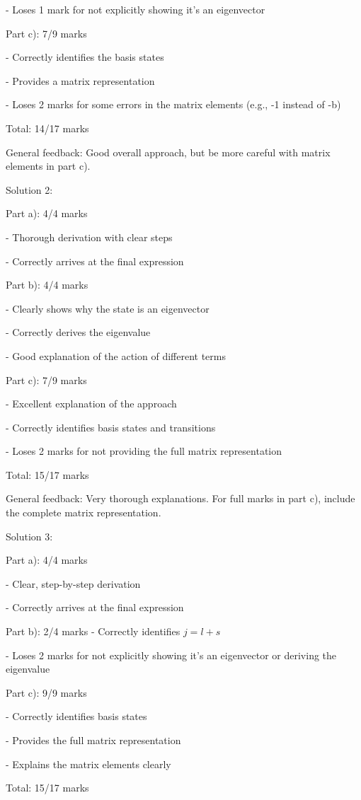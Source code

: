 \documentclass[a4paper,11pt]{article}
\begin{document}
- Loses 1 mark for not explicitly showing it's an eigenvector

Part c): 7/9 marks

- Correctly identifies the basis states

- Provides a matrix representation

- Loses 2 marks for some errors in the matrix elements (e.g., -1 instead of -b)

Total: 14/17 marks

General feedback: Good overall approach, but be more careful with matrix elements in part c).

Solution 2:

Part a): 4/4 marks

- Thorough derivation with clear steps

- Correctly arrives at the final expression

Part b): 4/4 marks

- Clearly shows why the state is an eigenvector

- Correctly derives the eigenvalue

- Good explanation of the action of different terms

Part c): 7/9 marks

- Excellent explanation of the approach

- Correctly identifies basis states and transitions

- Loses 2 marks for not providing the full matrix representation

Total: 15/17 marks

General feedback: Very thorough explanations. For full marks in part c), include the complete matrix representation.

Solution 3:

Part a): 4/4 marks

- Clear, step-by-step derivation

- Correctly arrives at the final expression

Part b): 2/4 marks
- Correctly identifies \(j = l + s\)

- Loses 2 marks for not explicitly showing it's an eigenvector or deriving the eigenvalue

Part c): 9/9 marks

- Correctly identifies basis states

- Provides the full matrix representation

- Explains the matrix elements clearly

Total: 15/17 marks
\end{document}
